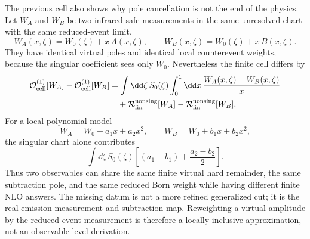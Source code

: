 \begin{controlledapproximation}
\label{ca:one-loop-measurement-dependence-after-cancellation}
The previous cell also shows why pole cancellation is not the end of the
physics.  Let \(W_A\) and \(W_B\) be two infrared-safe measurements in the same
unresolved chart with the same reduced-event limit,
\[
  W_A(x,\zeta)=W_0(\zeta)+x\,A(x,\zeta),
  \qquad
  W_B(x,\zeta)=W_0(\zeta)+x\,B(x,\zeta).
\]
They have identical virtual poles and identical local counterevent weights,
because the singular coefficient sees only \(W_0\).  Nevertheless the finite
cell differs by
\begin{equation}
\begin{aligned}
  \mathcal O_{\rm cell}^{(1)}[W_A]
  -
  \mathcal O_{\rm cell}^{(1)}[W_B]
  &=
  \int\dd\zeta\,S_0(\zeta)
  \int_0^1\dd x\,
    \frac{W_A(x,\zeta)-W_B(x,\zeta)}{x}  \\
  &\quad
  +
  \mathcal R_{\rm fin}^{\rm nonsing}[W_A]
  -
  \mathcal R_{\rm fin}^{\rm nonsing}[W_B].
\end{aligned}
  \label{eq:one-loop-measurement-dependence-after-cancellation}
\end{equation}
For a local polynomial model
\[
  W_A=W_0+a_1x+a_2x^2,
  \qquad
  W_B=W_0+b_1x+b_2x^2,
\]
the singular chart alone contributes
\[
  \int\dd\zeta\,S_0(\zeta)
  \left[(a_1-b_1)+\frac{a_2-b_2}{2}\right].
\]
Thus two observables can share the same finite virtual hard remainder, the
same subtraction pole, and the same reduced Born weight while having different
finite NLO answers.  The missing datum is not a more refined generalized cut;
it is the real-emission measurement and subtraction map.  Reweighting a
virtual amplitude by the reduced-event measurement is therefore a locally
inclusive approximation, not an observable-level derivation.
\end{controlledapproximation}

